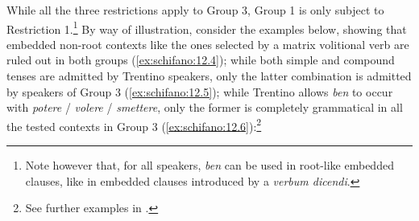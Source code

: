 \documentclass[output=paper]{langsci/langscibook}
\begin{document}
While all the three restrictions apply to Group 3, Group 1 is only subject to
Restriction 1.\footnote{Note however that, for all speakers, \emph{ben} can be
used in root-like embedded clauses, like in embedded clauses introduced by a
\emph{verbum dicendi}.}  By way of illustration, consider the examples below,
showing that embedded non-root contexts like the ones selected by a matrix
volitional verb are ruled out in both groups (\ref{ex:schifano:12.4}); while both simple and
compound tenses are admitted by Trentino speakers, only the latter combination
is admitted by speakers of Group 3 (\ref{ex:schifano:12.5}); while Trentino allows \emph{ben} to
occur with \emph{potere} / \emph{volere} / \emph{smettere}, only the former is
completely grammatical in all the tested contexts in Group 3 (\ref{ex:schifano:12.6}):\footnote{See
further examples in \textcite{CognSchi2018b,CognSchi2018}.}
\end{document}
